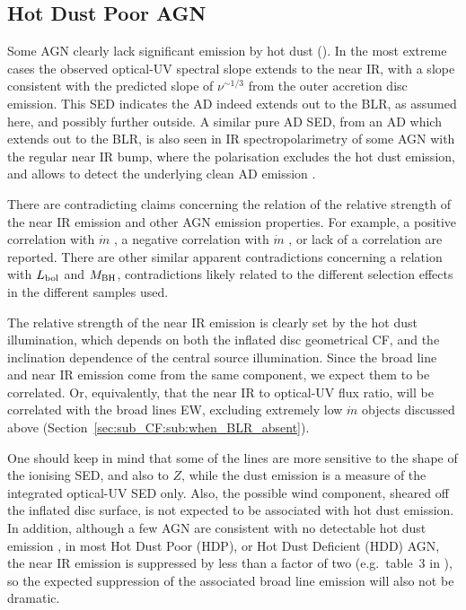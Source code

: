\documentclass[a4paper,fleqn,usenatbib]{mnras}
\begin{document}
\subsection{Hot Dust Poor AGN}

Some AGN clearly lack significant emission by hot dust (\citealt*{Jiang10, Hao10, Hao11, Jun13, Lyu17}). 
In the most extreme cases the observed optical-UV spectral slope extends to the near IR, with a slope
consistent with the predicted slope of $\nu^{\sim 1/3}$ from the outer accretion disc emission. This SED indicates the AD indeed extends out to 
the BLR, as assumed here, and possibly further outside.
A similar pure AD SED, from an AD which extends out to the BLR, is also seen in IR spectropolarimetry of some AGN with 
the regular near IR bump, where the polarisation excludes the hot dust emission, and allows to detect the underlying clean
AD emission  \citep{Kishimoto08}.

There are contradicting claims concerning the relation of the relative strength of the near IR emission and other AGN emission properties. For example, a positive correlation with $\dot{m}$ \citep{Jun13}, a negative correlation with $\dot{m}$ \citep{Lyu17}, or lack of a correlation 
\citep{Mor11} are reported. There are other similar apparent contradictions concerning a relation with 
$L_{\rm bol}$ and $M_{\rm BH}$, contradictions likely related to the different selection effects in the different samples used. 

The relative strength of the near IR emission is clearly set by the hot dust illumination, which depends on both the inflated disc geometrical CF, and the inclination dependence of the central source illumination. Since the broad line and near IR emission come from the same component, we expect them to be correlated. Or, equivalently, that the near IR to optical-UV
flux ratio, will be correlated with the broad lines EW, excluding extremely low $\dot{m}$ objects 
discussed above (Section~\ref{sec:sub_CF:sub:when_BLR_absent}). 

One should keep in mind that some of the lines are more sensitive to the shape of the ionising SED, 
and also to $Z$, while the dust emission is a measure of the integrated optical-UV SED only.
Also, the possible wind component, sheared off the inflated disc surface, is not expected to be associated with 
hot dust emission. In addition, although a few AGN are consistent with no detectable 
hot dust emission \citep{Jiang10}, in most Hot Dust Poor (HDP), or Hot Dust Deficient (HDD) AGN, 
the near IR emission is suppressed by less than a factor of two (e.g.\ table~3 in \citealt{Lyu17a}), so the expected suppression of the associated broad line emission will also not be dramatic.
\end{document}

